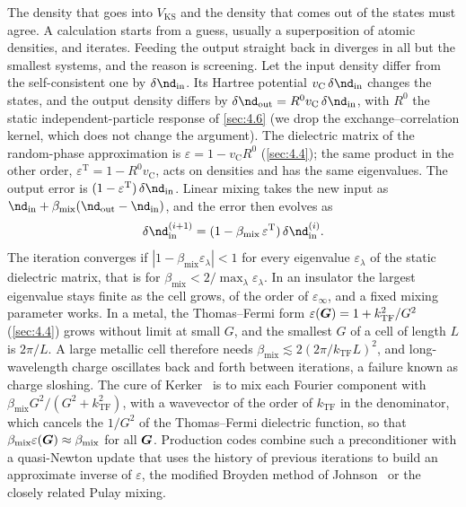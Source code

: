 The density that goes into $V_{\mathrm{KS}}$ and the density that comes out of the states must agree. A calculation starts from a guess, usually a superposition of atomic densities, and iterates. Feeding the output straight back in diverges in all but the smallest systems, and the reason is screening. Let the input density differ from the self-consistent one by $\delta\nd_{\mathrm{in}}$. Its Hartree potential $v_{\mathrm{C}}\,\delta\nd_{\mathrm{in}}$ changes the states, and the output density differs by $\delta\nd_{\mathrm{out}} = R^0v_{\mathrm{C}}\,\delta\nd_{\mathrm{in}}$, with $R^0$ the static independent-particle response of \cref{sec:4.6} (we drop the exchange--correlation kernel, which does not change the argument). The dielectric matrix of the random-phase approximation is $\varepsilon = 1 - v_{\mathrm{C}}R^0$ (\cref{sec:4.4}); the same product in the other order, $\varepsilon^{\mathrm{T}} = 1 - R^0v_{\mathrm{C}}$, acts on densities and has the same eigenvalues. The output error is $(1 - \varepsilon^{\mathrm{T}})\,\delta\nd_{\mathrm{in}}$. Linear mixing takes the new input as $\nd_{\mathrm{in}} + \beta_{\mathrm{mix}}(\nd_{\mathrm{out}} - \nd_{\mathrm{in}})$, and the error then evolves as
\begin{equation}
  \delta\nd_{\mathrm{in}}^{(i+1)} = (1 - \beta_{\mathrm{mix}}\,\varepsilon^{\mathrm{T}})\,\delta\nd_{\mathrm{in}}^{(i)} .
  \label{eq:E.1-mixing}
\end{equation}
The iteration converges if $|1 - \beta_{\mathrm{mix}}\varepsilon_\lambda| < 1$ for every eigenvalue $\varepsilon_\lambda$ of the static dielectric matrix, that is for $\beta_{\mathrm{mix}} < 2/\max_\lambda\varepsilon_\lambda$. In an insulator the largest eigenvalue stays finite as the cell grows, of the order of $\varepsilon_\infty$, and a fixed mixing parameter works. In a metal, the Thomas--Fermi form $\varepsilon(\bm{G}) = 1 + k_{\mathrm{TF}}^2/G^2$ (\cref{sec:4.4}) grows without limit at small $G$, and the smallest $G$ of a cell of length $L$ is $2\pi/L$. A large metallic cell therefore needs $\beta_{\mathrm{mix}} \lesssim 2(2\pi/k_{\mathrm{TF}}L)^2$, and long-wavelength charge oscillates back and forth between iterations, a failure known as charge sloshing. The cure of Kerker~\cite{kerker1981efficient} is to mix each Fourier component with $\beta_{\mathrm{mix}}G^2/(G^2 + k_{\mathrm{TF}}^2)$, with a wavevector of the order of $k_{\mathrm{TF}}$ in the denominator, which cancels the $1/G^2$ of the Thomas--Fermi dielectric function, so that $\beta_{\mathrm{mix}}\varepsilon(\bm{G}) \approx \beta_{\mathrm{mix}}$ for all $\bm{G}$. Production codes combine such a preconditioner with a quasi-Newton update that uses the history of previous iterations to build an approximate inverse of $\varepsilon$, the modified Broyden method of Johnson~\cite{johnson1988modified} or the closely related Pulay mixing.

